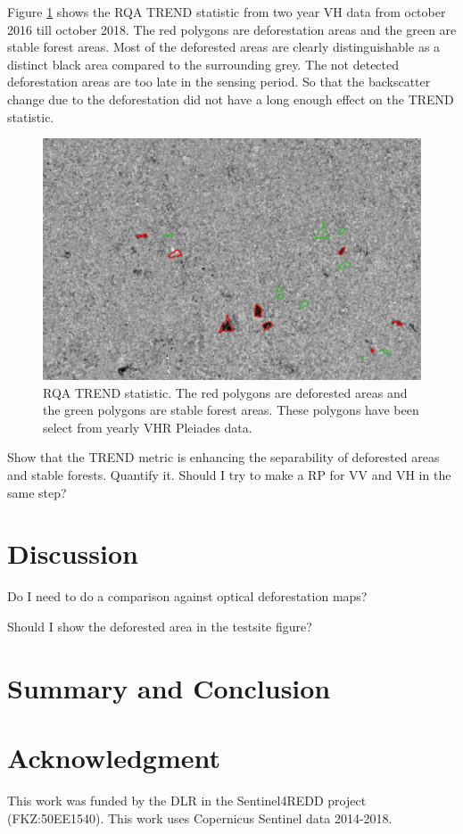 \documentclass{article}
\begin{document}
Figure \ref{trend} shows the RQA TREND statistic from two year VH data from october 2016 till october 2018.
The red polygons are deforestation areas and the green are stable forest areas.
Most of the deforested areas are clearly distinguishable as a distinct black area compared to the surrounding grey.
The not detected deforestation areas are too late in the sensing period.
So that the backscatter change due to the deforestation did not have a long enough effect on the TREND statistic.


\begin{figure}
  \includegraphics[width=\textwidth]{figs/TREND_Hidalgo_2016.png}
  \caption{RQA TREND statistic.  The red polygons are deforested areas and the green polygons are stable forest areas.
  These polygons have been select from yearly VHR Pleiades data.}
  \label{trend}
\end{figure}


Show that the TREND metric is enhancing the separability of deforested areas and stable forests.
Quantify it.
Should I try to make a RP for VV and VH in the same step?

\section{Discussion}

Do I need to do a comparison against optical deforestation maps?

Should I show the deforested area in the testsite figure?

\section{Summary and Conclusion}



\section*{Acknowledgment}
This work was funded by the DLR in the Sentinel4REDD project (FKZ:50EE1540).
This work uses Copernicus Sentinel data 2014-2018.




\end{document}

